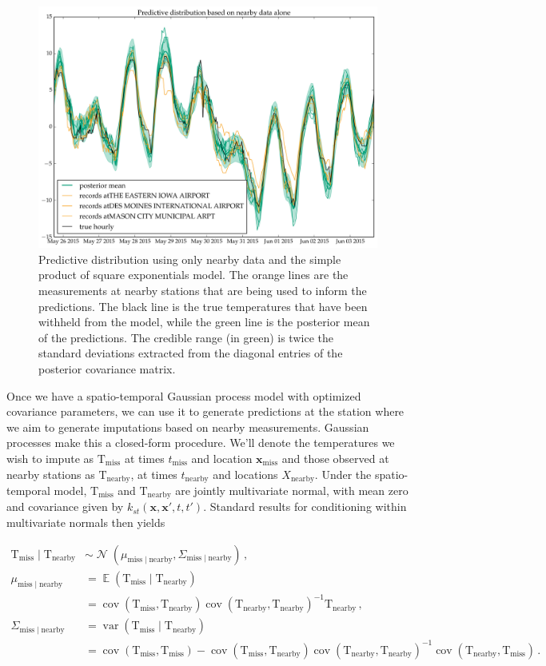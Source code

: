 \documentclass[letter]{article}
\makeatletter
\def\maxwidth{\ifdim\Gin@nat@width>\linewidth\linewidth
\else\Gin@nat@width\fi}
\let\Oldincludegraphics\includegraphics
\renewcommand{\includegraphics}[1]{\Oldincludegraphics[width=.8\maxwidth]{#1}}
\newcommand{\genericdel}[3]{%
      \left#1#3\right#2
    }
\newcommand{\del}[1]{\genericdel(){#1}}
\DeclareMathOperator{\E}{\mathbb{E}}
\DeclareMathOperator{\cov}{{cov}}
\DeclareMathOperator{\var}{{var}}
\DeclareMathOperator{\normal}{\mathcal{N}}
\newcommand{\T}{\mathrm{T}}
\newcommand{\xvec}{\mathbold{x}}
\newcommand{\miss}{\mathrm{miss}}
\newcommand{\obs}{\mathrm{nearby}}
\newcommand{\eqlabel}[1]{\label{#1}}
\makeatother
\begin{document}
\label{sec:predict_nearby}
        \begin{figure}
\centering
\includegraphics{../figures/predictive_nearby_SEonly.png}
\caption{\label{fig:predictive_nearby_SEonly}Predictive distribution using only nearby data and the simple product of square exponentials model. The orange lines are the measurements at nearby stations that are being used to inform the predictions. The black line is the true temperatures that have been withheld from the model, while the green line is the posterior mean of the predictions. The credible range (in green) is twice the standard deviations extracted from the diagonal entries of the posterior covariance matrix.}
\end{figure}

Once we have a spatio-temporal Gaussian process model with optimized covariance parameters, we can use it to generate predictions at the station where we aim to generate imputations based on nearby measurements.
Gaussian processes make this a closed-form procedure. We'll denote the temperatures we wish to impute as \(\T_\miss{}\) at times \(t_\miss\) and location \(\xvec_\miss\) and those observed at nearby stations as \(\T_\obs{}\), at times \(t_\obs\) and locations \(X_\obs\).
Under the spatio-temporal model, \(\T_\miss\) and \(\T_\obs\) are jointly multivariate normal, with mean zero and covariance given by \(k_{st}(\xvec,\xvec',t,t')\).
Standard results for conditioning within multivariate normals then yields

\begin{equation}
\begin{split}
    \T_\miss \mid \T_\obs &\sim \normal\del{\mu_{\miss \mid \obs}, \Sigma_{\miss \mid \obs}}\,, \\
    \mu_{\miss \mid \obs} &= \E \del{\T_\miss \mid \T_\obs} \\
        &= \cov\del{\T_\miss, \T_\obs} \cov\del{\T_\obs, \T_\obs}^{-1} \T_\obs\,, \\
    \Sigma_{\miss \mid \obs} &= \var \del{\T_\miss \mid \T_\obs} \\
        &= \cov\del{\T_\miss,\T_\miss} - \cov\del{\T_\miss, \T_\obs} \cov\del{\T_\obs, \T_\obs}^{-1} \cov\del{\T_\obs, \T_\miss}\,. \\ %
\end{split}
\eqlabel{eq:unconstrained_post}
\end{equation}
\end{document}
